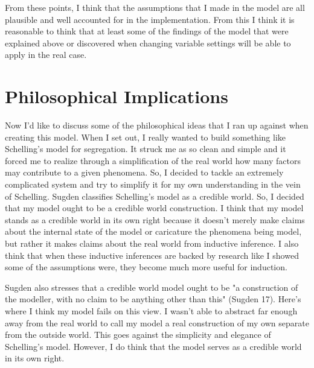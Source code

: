 \documentclass[11pt]{article}
\begin{document}
From these points, I think that the assumptions that I made in the model are all plausible and well accounted for in the implementation. From this I think it is reasonable to think that at least some of the findings of the model that were explained above or discovered when changing variable settings will be able to apply in the real case.

\section{Philosophical Implications} \hrulefill

Now I'd like to discuss some of the philosophical ideas that I ran up against when creating this model. When I set out, I really wanted to build something like Schelling's model for segregation. It struck me as so clean and simple and it forced me to realize through a simplification of the real world how many factors may contribute to a given phenomena. So, I decided to tackle an extremely complicated system and try to simplify it for my own understanding in the vein of Schelling. Sugden classifies Schelling's model as a credible world. So, I decided that my model ought to be a credible world construction. I think that my model stands as a credible world in its own right because it doesn't merely make claims about the internal state of the model or caricature the phenomena being model, but rather it makes claims about the real world from inductive inference. I also think that when these inductive inferences are backed by research like I showed some of the assumptions were, they become much more useful for induction.

Sugden also stresses that a credible world model ought to be "a construction of the modeller, with no claim to be anything other than this" (Sugden 17). Here's where I think my model fails on this view. I wasn't able to abstract far enough away from the real world to call my model a real construction of my own separate from the outside world. This goes against the simplicity and elegance of Schelling's model. However, I do think that the model serves as a credible world in its own right.
\end{document}
